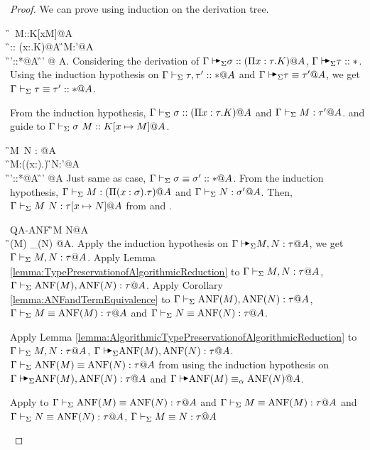 \begin{proof}
    We can prove using induction on the derivation tree.
    \begin{rneqncase}{\KAApp{}}{
            \G\AVS \sigma\ M::K[x\mapsto M]@A \\
            \G\AVS \sigma:: (\Pi x:\tau.K)@A \text{ , }
            \G\AVS M:\tau'@A \text{ , } \\
            \G\AVS\tau'::*@A  
            \G\AVS \tau \E \tau' @ A.
        }
        Considering the derivation of \( \G\AVS \sigma:: (\Pi x:\tau.K)@A \), \( \G \AVS \tau::* \).
        Using the induction hypothesis on \( \Gamma \vdash_\Sigma \tau, \tau'::* @ A \) and \( \G\AVS \tau \E \tau' @ A \),
        we get \( \Gamma\vdash_\Sigma \tau \equiv \tau' :: * @ A \).

        From the induction hypothesis, \( \Gamma\vdash_\Sigma \sigma:: (\Pi x:\tau.K)@A \) and \( \Gamma\vdash_\Sigma M:\tau'@A \).
        \TConv and \KApp guide to \( \G\V \sigma\ M::K[x\mapsto M]@A \).

    \end{rneqncase}
    \begin{rneqncase}{\TAApp}{
            \G\AVS M\ N : \tau[x\mapsto N]@A \\
            \G\AVS M:(\Pi (x:\sigma).\tau) \text{ , }
            \G\AVS N:\sigma'@A \text{ , } \\
            \G\AVS \sigma'::*@A 
            \G\AVS \sigma\E\sigma' @A
        }
        Just same as \KApp case, \( \Gamma\vdash_\Sigma \sigma\equiv\sigma' :: * @A \).
        From the induction hypothesis, \( \Gamma\vdash_\Sigma M:(\Pi (x:\sigma).\tau) @ A\) and \( \Gamma\vdash_\Sigma N:\sigma'@A \).
        Then, \( \Gamma\vdash_\Sigma M\ N : \tau[x\mapsto N]@A \) from \TConv and \TApp.
    \end{rneqncase}
    \begin{rneqncase}{\textsc{QA-ANF}}{
            \G \AV M \E N@A \\
            \G \AV \ANF(M) \E_\alpha \ANF(N) @A.
        }
        Apply the induction hypothesis on \( \G \AVS M, N : \tau @ A \), we get \( \Gamma \vdash_\Sigma M, N : \tau @ A \).
        Apply Lemma \ref{lemma:TypePreservationofAlgorithmicReduction} to \( \Gamma \vdash_\Sigma M, N : \tau @ A \), \( \Gamma \vdash_\Sigma \text{ANF}(M), \text{ANF}(N) : \tau @ A \).
        Apply Corollary \ref{lemma:ANFandTermEquivalence} to \( \Gamma \vdash_\Sigma \text{ANF}(M), \text{ANF}(N) : \tau @ A \), \( \Gamma \vdash_\Sigma M \equiv \text{ANF}(M) : \tau @ A \) and \( \Gamma \vdash_\Sigma N \equiv \text{ANF}(N) : \tau @ A \).

        Apply Lemma \ref{lemma:AlgorithmicTypePreservationofAlgorithmicReduction} to \( \Gamma \vdash_\Sigma M, N : \tau @ A \), \( \G \AVS \ANF(M), \ANF(N) : \tau @ A \).
        \( \Gamma \vdash_\Sigma \text{ANF}(M) \equiv \text{ANF}(N) : \tau @ A \) from using the induction hypothesis on \( \G \AVS \ANF(M), \ANF(N) : \tau @ A \) and \( \G \AV \ANF(M) \E_\alpha \ANF(N) @A \).

        Apply \QTrans to \( \Gamma \vdash_\Sigma \text{ANF}(M) \equiv \text{ANF}(N) : \tau @ A \) and \( \Gamma \vdash_\Sigma M \equiv \text{ANF}(M) : \tau @ A \) and \( \Gamma \vdash_\Sigma N \equiv \text{ANF}(N) : \tau @ A \), \( \Gamma \vdash_\Sigma M \equiv N : \tau @ A \)
    \end{rneqncase}
\end{proof}

